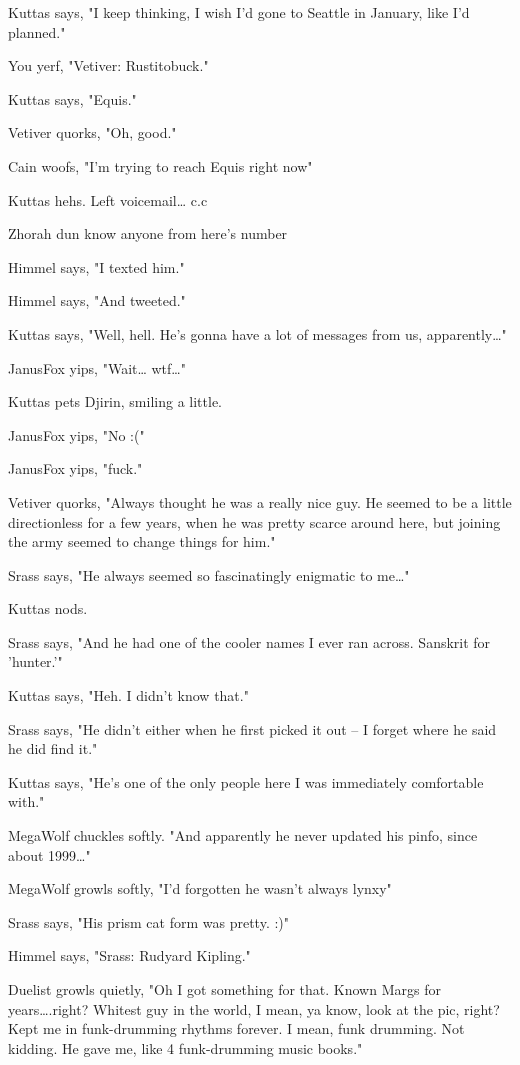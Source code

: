 Kuttas says, "I keep thinking, I wish I'd gone to Seattle in January, like I'd planned."

You yerf, "Vetiver: Rustitobuck."

Kuttas says, "Equis."

Vetiver quorks, "Oh, good."

Cain woofs, "I'm trying to reach Equis right now"

Kuttas hehs. Left voicemail\ldots{} c.c

Zhorah dun know anyone from here's number

Himmel says, "I texted him."

Himmel says, "And tweeted."

Kuttas says, "Well, hell. He's gonna have a lot of messages from us, apparently\ldots{}"

JanusFox yips, "Wait\ldots{} wtf\ldots{}"

Kuttas pets Djirin, smiling a little.

JanusFox yips, "No :("

JanusFox yips, "fuck."

Vetiver quorks, "Always thought he was a really nice guy. He seemed to be a little directionless for a few years, when he was pretty scarce around here, but joining the army seemed to change things for him."

Srass says, "He always seemed so fascinatingly enigmatic to me\ldots{}"

Kuttas nods.

Srass says, "And he had one of the cooler names I ever ran across.  Sanskrit for 'hunter.'"

Kuttas says, "Heh. I didn't know that."

Srass says, "He didn't either when he first picked it out -- I forget where he said he did find it."

Kuttas says, "He's one of the only people here I was immediately comfortable with."

MegaWolf chuckles softly. "And apparently he never updated his pinfo, since about 1999\ldots{}"

MegaWolf growls softly, "I'd forgotten he wasn't always lynxy"

Srass says, "His prism cat form was pretty. :)"

Himmel says, "Srass: Rudyard Kipling."

Duelist growls quietly, "Oh I got something for that. Known Margs for years\ldots{}.right? Whitest guy in the world, I mean, ya know, look at the pic, right? Kept me in funk-drumming rhythms forever. I mean, funk drumming. Not kidding. He gave me, like 4 funk-drumming music books."

